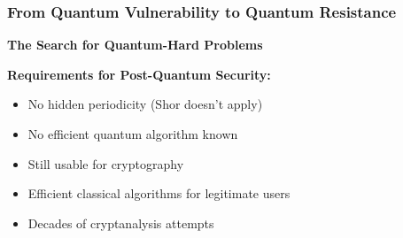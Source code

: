 \documentclass[aspectratio=169,10pt]{beamer}
\newcommand{\teaching}[1]{}
\newcommand{\slideheader}[1]{\frametitle{#1}}
\theoremstyle{plain}
\begin{document}
\begin{frame}
  \slideheader{From Quantum Vulnerability to Quantum Resistance}
  
  \begin{center}
    \textbf{\large The Search for Quantum-Hard Problems}
  \end{center}
  
  \vspace{0.5cm}
  
  \begin{blueBox}
    \textbf{Requirements for Post-Quantum Security:}
    \begin{itemize}
      \item[$\times$] No hidden periodicity (Shor doesn't apply)
      \item[$\times$] No efficient quantum algorithm known
      \item[\checkmark] Still usable for cryptography
      \item[\checkmark] Efficient classical algorithms for legitimate users
      \item[\checkmark] Decades of cryptanalysis attempts
    \end{itemize}
  \end{blueBox}
  
  \vspace{0.5cm}
  
  \pause
  
  \begin{center}
  \end{center}
  
  \teaching{Introduce lattices as the solution}
\end{frame}
\end{document}
